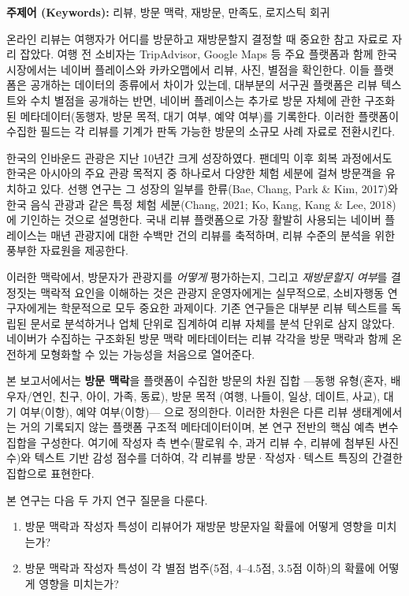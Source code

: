 \documentclass[10pt,a4paper]{article}
\newcommand{\sect}[1]{\vspace{10pt}\noindent{\Large\bfseries #1}\par\vspace{3pt}}
\newcommand{\subsect}[1]{\vspace{6pt}\noindent{\large\bfseries #1}\par\vspace{2pt}}
\begin{document}
\noindent\textbf{주제어 (Keywords):} 리뷰, 방문 맥락, 재방문, 만족도,
로지스틱 회귀

\sect{I. 서론}

\subsect{1.1 연구배경}
온라인 리뷰는 여행자가 어디를 방문하고 재방문할지 결정할 때 중요한 참고
자료로 자리 잡았다. 여행 전 소비자는 TripAdvisor, Google Maps 등 주요
플랫폼과 함께 한국 시장에서는 네이버 플레이스와 카카오맵에서 리뷰, 사진,
별점을 확인한다. 이들 플랫폼은 공개하는 데이터의 종류에서 차이가 있는데,
대부분의 서구권 플랫폼은 리뷰 텍스트와 수치 별점을 공개하는 반면, 네이버
플레이스는 추가로 방문 자체에 관한 구조화된 메타데이터(동행자, 방문
목적, 대기 여부, 예약 여부)를 기록한다. 이러한 플랫폼이 수집한 필드는
각 리뷰를 기계가 판독 가능한 방문의 소규모 사례 자료로 전환시킨다.

한국의 인바운드 관광은 지난 10년간 크게 성장하였다. 팬데믹 이후 회복
과정에서도 한국은 아시아의 주요 관광 목적지 중 하나로서 다양한 체험
세분에 걸쳐 방문객을 유치하고 있다. 선행 연구는 그 성장의 일부를
한류(Bae, Chang, Park \& Kim, 2017)와 한국 음식 관광과 같은 특정
체험 세분(Chang, 2021; Ko, Kang, Kang \& Lee, 2018)에 기인하는
것으로 설명한다. 국내 리뷰 플랫폼으로 가장 활발히 사용되는 네이버
플레이스는 매년 관광지에 대한 수백만 건의 리뷰를 축적하며, 리뷰
수준의 분석을 위한 풍부한 자료원을 제공한다.

이러한 맥락에서, 방문자가 관광지를 \emph{어떻게} 평가하는지, 그리고
\emph{재방문할지 여부}를 결정짓는 맥락적 요인을 이해하는 것은 관광지
운영자에게는 실무적으로, 소비자행동 연구자에게는 학문적으로 모두 중요한
과제이다. 기존 연구들은 대부분 리뷰 텍스트를 독립된 문서로 분석하거나
업체 단위로 집계하여 리뷰 자체를 분석 단위로 삼지 않았다. 네이버가
수집하는 구조화된 방문 맥락 메타데이터는 리뷰 각각을 방문 맥락과 함께
온전하게 모형화할 수 있는 가능성을 처음으로 열어준다.

본 보고서에서는 \textbf{방문 맥락}을 플랫폼이 수집한 방문의 차원 집합
---동행 유형(혼자, 배우자/연인, 친구, 아이, 가족, 동료), 방문 목적
(여행, 나들이, 일상, 데이트, 사교), 대기 여부(이항), 예약 여부(이항)---
으로 정의한다. 이러한 차원은 다른 리뷰 생태계에서는 거의 기록되지 않는
플랫폼 구조적 메타데이터이며, 본 연구 전반의 핵심 예측 변수 집합을
구성한다. 여기에 작성자 측 변수(팔로워 수, 과거 리뷰 수, 리뷰에 첨부된
사진 수)와 텍스트 기반 감성 점수를 더하여, 각 리뷰를 방문·작성자·텍스트
특징의 간결한 집합으로 표현한다.

\subsect{1.2 연구 질문}
본 연구는 다음 두 가지 연구 질문을 다룬다.
\begin{enumerate}[leftmargin=16pt, itemsep=2pt]
  \item 방문 맥락과 작성자 특성이 리뷰어가 재방문 방문자일 확률에
        어떻게 영향을 미치는가?
  \item 방문 맥락과 작성자 특성이 각 별점 범주(5점, 4--4.5점,
        3.5점 이하)의 확률에 어떻게 영향을 미치는가?
\end{enumerate}
\end{document}
